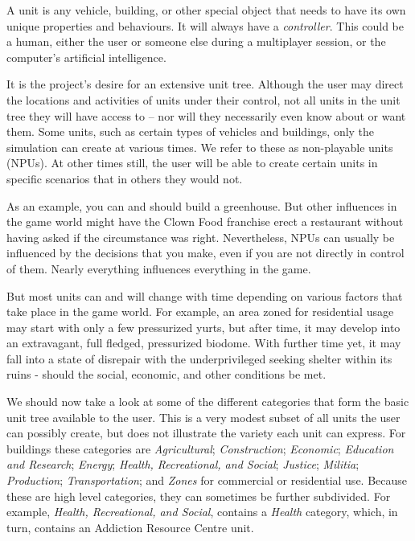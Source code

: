 

A unit is any vehicle, building, or other special object that needs to have its own unique properties and behaviours. It will always have a {\it controller}. This could be a human, either the user or someone else during a multiplayer session, or the computer's artificial intelligence.

It is the project's desire for an extensive unit tree. Although the user may direct the locations and activities of units under their control, not all units in the unit tree they will have access to -- nor will they necessarily even know about or want them. Some units, such as certain types of vehicles and buildings, only the simulation can create at various times. We refer to these as non-playable units (NPUs). At other times still, the user will be able to create certain units in specific scenarios that in others they would not.

As an example, you can and should build a greenhouse. But other influences in the game world might have the Clown Food franchise erect a restaurant without having asked if the circumstance was right. Nevertheless, NPUs can usually be influenced by the decisions that you make, even if you are not directly in control of them. Nearly everything influences everything in the game.

But most units can and will change with time depending on various factors that take place in the game world. For example, an area zoned for residential usage may start with only a few pressurized yurts, but after time, it may develop into an extravagant, full fledged, pressurized biodome. With further time yet, it may fall into a state of disrepair with the underprivileged seeking shelter within its ruins - should the social, economic, and other conditions be met.

We should now take a look at some of the different categories that form the basic unit tree available to the user. This is a very modest subset of all units the user can possibly create, but does not illustrate the variety each unit can express. For buildings these categories are {\it Agricultural}; {\it Construction}; {\it Economic}; {\it Education and Research}; {\it Energy}; {\it Health, Recreational, and Social}; {\it Justice}; {\it Militia}; {\it Production}; {\it Transportation}; and {\it Zones} for commercial or residential use. Because these are high level categories, they can sometimes be further subdivided. For example, {\it Health, Recreational, and Social}, contains a {\it Health} category, which, in turn, contains an Addiction Resource Centre unit.


